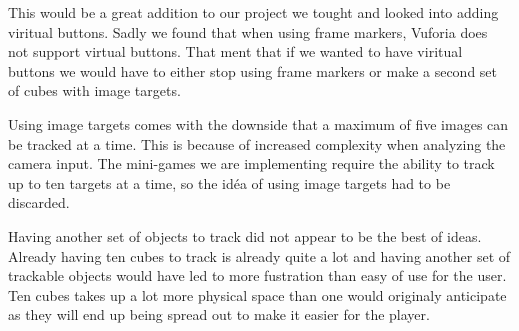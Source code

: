 This would be a great addition to our project we tought and looked into adding viritual buttons.
Sadly we found that when using frame markers, Vuforia does not support virtual buttons. That ment that if we wanted to have viritual buttons we would have to either stop using frame markers or make a second set of cubes with image targets.

Using image targets comes with the downside that a maximum of five images can be tracked at a time. This is because of increased complexity when analyzing the camera input. The mini-games we are implementing require the ability to track up to ten targets at a time, so the id\'ea of using image targets had to be discarded.

Having another set of objects to track did not appear to be the best of ideas. 
Already having ten cubes to track is already quite a lot and having another set of trackable objects would have led to more fustration than easy of use for the user.
Ten cubes takes up a lot more physical space than one would originaly anticipate as they will end up being spread out to make it easier for the player.

